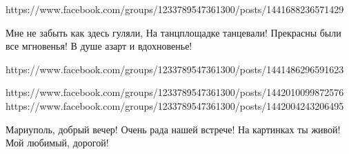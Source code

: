  
 
 
 
 

https://www.facebook.com/groups/1233789547361300/posts/1441688236571429

Мне не забыть как здесь гуляли,
На танцплощадке танцевали!
Прекрасны были все мгновенья!
В душе азарт и вдохновенье!

https://www.facebook.com/groups/1233789547361300/posts/1441486296591623

https://www.facebook.com/groups/1233789547361300/posts/1442010099872576
https://www.facebook.com/groups/1233789547361300/posts/1442004243206495

Мариуполь, добрый вечер!
Очень рада нашей встрече!
На картинках ты живой!
Мой любимый, дорогой!
